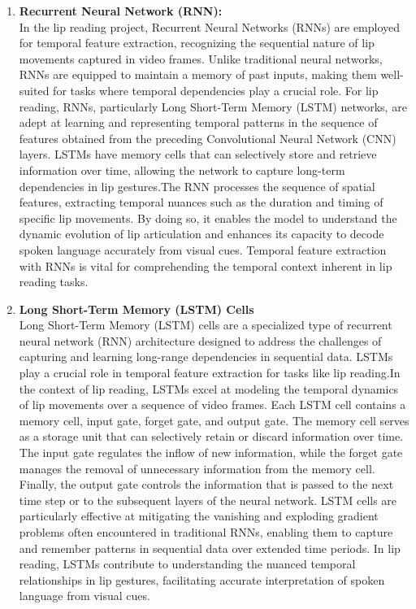 \begin{enumerate}
	\pagebreak
	\item \textbf{Recurrent Neural Network (RNN):}
	\\In the lip reading project, Recurrent Neural Networks (RNNs) are employed for temporal feature extraction, recognizing the sequential nature of lip movements captured in video frames. Unlike traditional neural networks, RNNs are equipped to maintain a memory of past inputs, making them well-suited for tasks where temporal dependencies play a crucial role. For lip reading, RNNs, particularly Long Short-Term Memory (LSTM) networks, are adept at learning and representing temporal patterns in the sequence of features obtained from the preceding Convolutional Neural Network (CNN) layers. LSTMs have memory cells that can selectively store and retrieve information over time, allowing the network to capture long-term dependencies in lip gestures.The RNN processes the sequence of spatial features, extracting temporal nuances such as the duration and timing of specific lip movements. By doing so, it enables the model to understand the dynamic evolution of lip articulation and enhances its capacity to decode spoken language accurately from visual cues. Temporal feature extraction with RNNs is vital for comprehending the temporal context inherent in lip reading tasks.
	\item \textbf{Long Short-Term Memory (LSTM) Cells}
	\\Long Short-Term Memory (LSTM) cells are a specialized type of recurrent neural network (RNN) architecture designed to address the challenges of capturing and learning long-range dependencies in sequential data. LSTMs play a crucial role in temporal feature extraction for tasks like lip reading.In the context of lip reading, LSTMs excel at modeling the temporal dynamics of lip movements over a sequence of video frames. Each LSTM cell contains a memory cell, input gate, forget gate, and output gate. The memory cell serves as a storage unit that can selectively retain or discard information over time. The input gate regulates the inflow of new information, while the forget gate manages the removal of unnecessary information from the memory cell. Finally, the output gate controls the information that is passed to the next time step or to the subsequent layers of the neural network. LSTM cells are particularly effective at mitigating the vanishing and exploding gradient problems often encountered in traditional RNNs, enabling them to capture and remember patterns in sequential data over extended time periods. In lip reading, LSTMs contribute to understanding the nuanced temporal relationships in lip gestures, facilitating accurate interpretation of spoken language from visual cues.


\end{enumerate}
